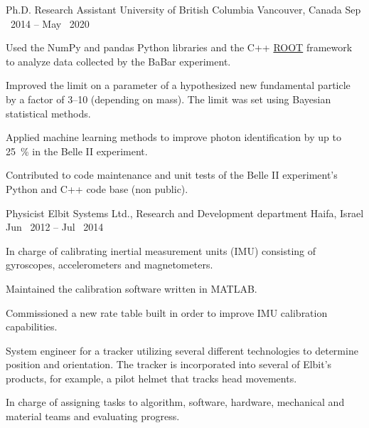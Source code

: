 

\begin{cventries}

    \cventryWithTags
    {Ph.D. Research Assistant} %
    {University of British Columbia} %
    {Vancouver, Canada} %
    {Sep \ 2014 -- May \ 2020} %
    {         \fbox{\LaTeX}} %
    {
      \begin{cvitems} %
      \item {Used the NumPy and pandas Python libraries and the C++ \hypersetup{urlcolor=blue}\href{https://root.cern.ch/}{ROOT} framework to analyze data collected by the BaBar experiment.}
      \item {Improved the limit on a parameter of a hypothesized new fundamental particle by a factor of 3--10 (depending on mass). The limit was set using Bayesian statistical methods.}
        \item {Applied machine learning methods to improve photon identification by up to \SI{25}{\percent} in the Belle II experiment.}
        \item {Contributed to code maintenance and unit tests of the Belle II experiment's Python and C++ code base (non public).}
      \end{cvitems}
    }

    \cventryWithTags
    {Physicist} %
    {Elbit Systems Ltd., Research and Development department} %
    {Haifa, Israel} %
    {Jun \ 2012 -- Jul \ 2014} %
    {  }
    {
      \begin{cvitems} %
        \item {In charge of calibrating inertial measurement units (IMU) consisting of gyroscopes, accelerometers and magnetometers.}
        \item {Maintained the calibration software written in MATLAB.}
        \item {Commissioned a new rate table built in order to improve IMU calibration capabilities.}
        \item {System engineer for a tracker utilizing several different
          technologies to determine position and orientation. The tracker is incorporated into several of Elbit's products, for example, a pilot helmet that tracks head movements.}
        \item {In charge of assigning tasks to algorithm, software, hardware, mechanical and material teams and evaluating progress.}
      \end{cvitems}
    }


\end{cventries}
